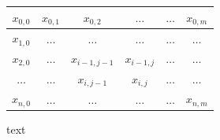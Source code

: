 \begin{figure}
	\centering
	\begin{tabular}{|c | c |c | c |c | c |} \hline
		$x_{0, 0}$ & $x_{0, 1}$ & $x_{0, 2}$                         & $\dots$                           & $\dots$ & $x_{0, m}$ \\ \hline
		$x_{1, 0}$ & $\dots$    & $\dots$                            & $\dots$                           & $\dots$ & $\dots$    \\ \hline 
		$x_{2, 0}$ & $\dots$    & \cellcolor{blue!10} $x_{i-1, j-1}$ & \cellcolor{blue!10}$x_{i - 1, j}$ & $\dots$ & $\dots$    \\ \hline 
		$\dots$    & $\dots$    & \cellcolor{blue!10}$x_{i, j - 1}$  & \cellcolor{blue!10}$x_{i, j}$     & $\dots$ & $\dots$    \\ \hline 
		$x_{n, 0}$ & $\dots$    & $\dots$                            & $\dots$                           & $\dots$ & $x_{n, m}$ \\ \hline 
	\end{tabular}
	\caption{text}
\end{figure}



